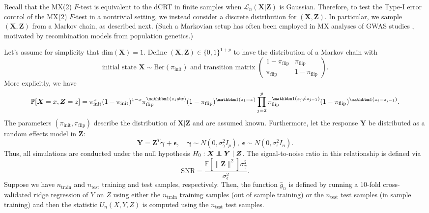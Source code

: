 \documentclass[12pt]{article}
\theoremstyle{definition}
\theoremstyle{remark}
\def\independenT#1#2{\mathrel{\rlap{$#1#2$}\mkern2mu{#1#2}}}
\newcommand\independent{\protect\mathpalette{\protect\independenT}{\perp}}
\newcommand{\eps}{\epsilon}
\newcommand{\prx}{\bm X}
\newcommand{\srx}{X}
\newcommand{\prz}{\bm Z}
\newcommand{\srz}{Z}
\newcommand{\pry}{{\bm Y}}
\newcommand{\sry}{Y}
\newcommand{\peps}{\bm \epsilon}
\begin{document}
Recall that the MX(2) $F$-test is equivalent to the dCRT in finite samples when $\mathcal L_n(\prx|\prz)$ is Gaussian. Therefore, to test the Type-I error control of the MX(2) $F$-test in a nontrivial setting, we instead consider a discrete distribution for $(\prx,\prz)$. In particular, we sample $(\prx, \prz)$ from a Markov chain, as described next. (Such a Markovian setup has often been employed in MX analyses of GWAS studies \cite{SetC17, SetS19, Bates2020}, motivated by recombination models from population genetics.)

Let's assume for simplicity that $\text{dim}(\prx) = 1$. Define $(\prx,\prz) \in \{0,1\}^{1+p}$ to have the distribution of a Markov chain with 
\begin{equation*}
	\text{initial state } \prx \sim \text{Ber}(\pi_{\text{init}}) \text{ and transition matrix } \begin{pmatrix}1-\pi_\text{flip} & \pi_{\text{flip}} \\  \pi_{\text{flip}} &  1-\pi_{\text{flip}}\end{pmatrix}.
\end{equation*}
More explicitly, we have
\begin{equation*}
	\mathbb P[\prx = x, \prz = z] = \pi_{\text{init}}^{x}(1-\pi_{\text{init}})^{1-x} \pi_{\text{flip}}^{\mathbbm 1(z_1 \neq x)} (1-\pi_{\text{flip}})^{\mathbbm 1(z_1 = x)} \prod_{j = 2}^p \pi_{\text{flip}}^{\mathbbm 1(z_j \neq z_{j-1})} (1-\pi_{\text{flip}})^{\mathbbm 1(z_j = z_{j-1})}.
\end{equation*}
The parameters $(\pi_{\text{init}}, \pi_{\text{flip}})$ describe the distribution of $\prx|\prz$ and are assumed known. Furthermore, let the response $\pry$ be distributed as a random effects model in $\prz$:
\begin{equation*}
	\pry = \prz^T \bm \gamma + \peps, \quad \bm \gamma \sim N(0, \sigma^2_{\gamma}I_p),\ \peps \sim N(0, \sigma^2_\eps I_n).
\end{equation*}
Thus, all simulations are conducted under the null hypothesis $H_0: \prx \independent \pry \mid \prz$. The signal-to-noise ratio in this relationship is defined via
\begin{equation*}
	\text{SNR} = \frac{\mathbb E[\|\prz\|^2]\sigma^2_\gamma}{\sigma^2_\eps}.
\end{equation*}
Suppose we have $n_{\text{train}}$ and $n_{\text{test}}$ training and test samples, respectively. Then, the function $\widehat g_n$ is defined by running a 10-fold cross-validated ridge regression of $\sry$ on $\srz$ using either the $n_{\text{train}}$ training samples (out of sample training) or the $n_{\text{test}}$ test samples (in sample training) and then the statistic $U_n(\srx, \sry, \srz)$ is computed using the $n_{\text{test}}$ test samples.
\end{document}
